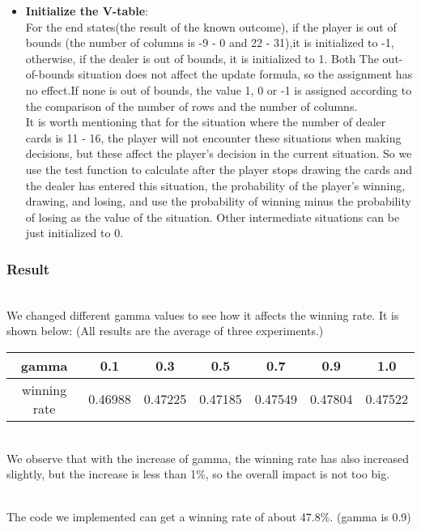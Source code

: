 \documentclass[12pt]{article}
\begin{document}
\begin{itemize}
  \item \textbf{Initialize the V-table}:
    ~\\For the end states(the result of the known outcome), if the player is out of bounds (the number of columns is -9 - 0 and 22 - 31),it is initialized to -1, otherwise, if the dealer is out of bounds, it is initialized to 1. Both The out-of-bounds situation does not affect the update formula, so the assignment has no effect.If none is out of bounds, the value 1, 0 or -1 is assigned according to the comparison of the number of rows and the number of columns.
    ~\\It is worth mentioning that for the situation where the number of dealer cards is 11 - 16, the player will not encounter these situations when making decisions, but these affect the player's decision in the current situation. So we use the test function to calculate after the player stops drawing the cards and the dealer has entered this situation, the probability of the player's winning, drawing, and losing, and use the probability of winning minus the probability of losing as the value of the situation. Other intermediate situations can be just initialized to 0.
\end{itemize}

\subsubsection{Result}

~\\\indent We changed different gamma values to see how it affects the winning rate. It is shown below: (All results are the average of three experiments.)
\begin{table}[!htbp]
  \centering
  \begin{tabular}{c|c|c|c|c|c|c}
    \hline
    gamma & 0.1 & 0.3 & 0.5 & 0.7 & 0.9 & 1.0 \\
    \hline
    winning rate & 0.46988 & 0.47225 & 0.47185 & 0.47549 & 0.47804 & 0.47522 \\   %
    \hline
  \end{tabular}
\end{table}
~\\ We observe that with the increase of gamma, the winning rate has also increased slightly, but the increase is less than 1\%, so the overall impact is not too big.

~\\\indent The code we implemented can get a winning rate of about 47.8\%. (gamma is 0.9)
\end{document}
